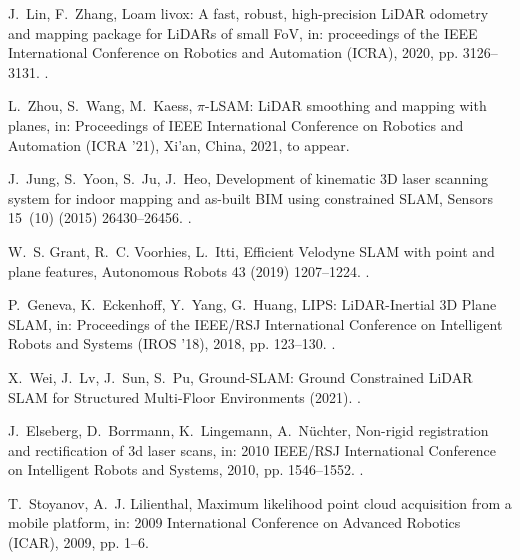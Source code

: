 \documentclass[5p]{elsarticle}
\begin{document}
\begin{thebibliography}{10}
J.~Lin, F.~Zhang, {Loam livox: A fast, robust, high-precision LiDAR odometry
  and mapping package for LiDARs of small FoV}, in: proceedings of the IEEE
  International Conference on Robotics and Automation (ICRA), 2020, pp.
  3126--3131.
\newblock \href {http://dx.doi.org/10.1109/ICRA40945.2020.9197440}
  {}.

L.~Zhou, S.~Wang, M.~Kaess, {$\pi$}-{LSAM}: {LiDAR} smoothing and mapping with
  planes, in: Proceedings of IEEE International Conference on Robotics and
  Automation (ICRA '21), Xi'an, China, 2021, to appear.

J.~Jung, S.~Yoon, S.~Ju, J.~Heo, {Development of kinematic 3D laser scanning
  system for indoor mapping and as-built BIM using constrained SLAM}, Sensors
  15~(10) (2015) 26430--26456.
\newblock \href {http://dx.doi.org/10.3390/s151026430}
  {}.

W.~S. Grant, R.~C. Voorhies, L.~Itti, {Efficient Velodyne SLAM with point and
  plane features}, Autonomous Robots 43 (2019) 1207--1224.
\newblock \href {http://dx.doi.org/10.1007/s10514-018-9794-6}
  {}.

P.~Geneva, K.~Eckenhoff, Y.~Yang, G.~Huang, {LIPS: LiDAR-Inertial 3D Plane
  SLAM}, in: Proceedings of the IEEE/RSJ International Conference on
  Intelligent Robots and Systems (IROS '18), 2018, pp. 123--130.
\newblock \href {http://dx.doi.org/10.1109/IROS.2018.8594463}
  {}.

X.~Wei, J.~Lv, J.~Sun, S.~Pu, {Ground-SLAM: Ground Constrained LiDAR SLAM for
  Structured Multi-Floor Environments} (2021).
\newblock \href {http://arxiv.org/abs/2103.03713} {}.

J.~Elseberg, D.~Borrmann, K.~Lingemann, A.~Nüchter, Non-rigid registration and
  rectification of 3d laser scans, in: 2010 IEEE/RSJ International Conference
  on Intelligent Robots and Systems, 2010, pp. 1546--1552.
\newblock \href {http://dx.doi.org/10.1109/IROS.2010.5652278}
  {}.

T.~Stoyanov, A.~J. Lilienthal, Maximum likelihood point cloud acquisition from
  a mobile platform, in: 2009 International Conference on Advanced Robotics
  (ICAR), 2009, pp. 1--6.


\end{thebibliography}
\end{document}
